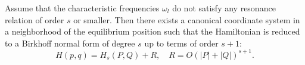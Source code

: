 Assume that the characteristic frequencies $\omega_l$ do not satisfy any resonance relation of order $s$ or smaller. Then there exists a canonical coordinate system in a neighborhood of the equilibrium position such that the Hamiltonian is reduced to a Birkhoff normal form of degree $s$ up to terms of order $s+1$:
$$H(p,q) = H_s(P,Q) + R, \quad R = O(|P| + |Q|)^{s+1}.$$

